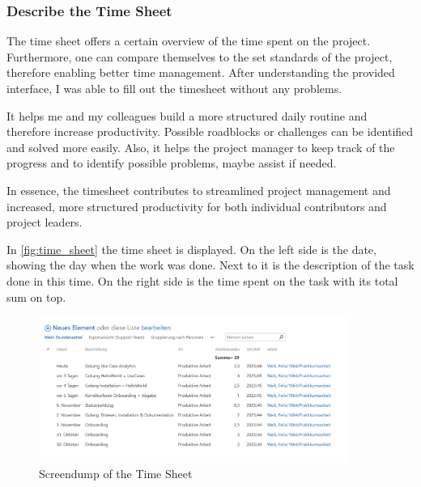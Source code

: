 \subsubsection*{Describe the Time Sheet}
The time sheet offers a certain overview of the time spent on the project. 
Furthermore, one can compare themselves to the set standards of the project, therefore enabling better time management.
After understanding the provided interface, I was able to fill out the timesheet without any problems.

It helps me and my colleagues build a more structured daily routine and therefore increase productivity. Possible roadblocks or challenges can be identified and solved more easily.
Also, it helps the project manager to keep track of the progress and to identify possible problems, maybe assist if needed.

In essence, the timesheet contributes to streamlined project management and increased, more structured productivity for both individual contributors and project leaders.

In \autoref{fig:time_sheet} the time sheet is displayed.
On the left side is the date, showing the day when the work was done.
Next to it is the description of the task done in this time.
On the right side is the time spent on the task with its total sum on top.

\begin{figure}[h]
    \centering
    \includegraphics[width=0.9\textwidth]{figures/onboarding/stundenzettel_screendump.png}
    \caption{Screendump of the Time Sheet}
    \label{fig:time_sheet}
\end{figure}

